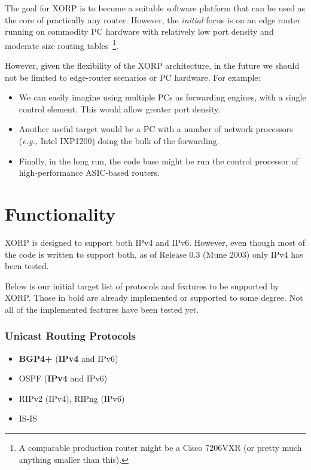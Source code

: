 \documentclass[11pt]{article}
\newcommand{\eg}{\emph{e.g.,}\xspace}
\begin{document}
The goal for XORP is to become a suitable software platform that can
be used as the core of practically any router. However, the {\it
initial} focus is on an edge router running on commodity PC hardware
with relatively low port density and moderate size routing
tables~\footnote{A comparable production router might be a Cisco
7206VXR (or pretty much anything smaller than this).}.

However, given the flexibility of the XORP architecture, in the future
we should not be limited to edge-router scenarios or PC hardware.  For
example:
\begin{itemize}
  \item We can easily imagine using multiple PCs as forwarding engines,
  with a single control element. This would allow greater port density.

  \item Another useful target would be a PC with a number of network
  processors (\eg Intel IXP1200) doing the bulk of the forwarding.

  \item Finally, in the long run, the code base might be run the
  control processor of high-performance ASIC-based routers.
\end{itemize}

\section{Functionality}

XORP is designed to support both IPv4 and IPv6. However, even though
most of the code is written to support both, as of Release 0.3
(Mune 2003) only IPv4 has been tested.

Below is our initial target list of protocols and features to be
supported by XORP. Those in bold are already implemented or supported
to some degree. Not all of the implemented features have been tested
yet.

\subsubsection*{Unicast Routing Protocols}

\begin{itemize}
  \item {\bf BGP4+} ({\bf IPv4} and IPv6)
  \item OSPF ({\bf IPv4} and IPv6)
  \item RIPv2 (IPv4), RIPng (IPv6)
  \item IS-IS
\end{itemize}
\end{document}
